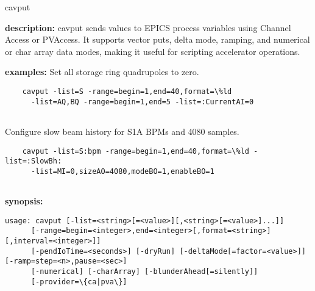 \begin{sddsprog}{cavput}
\item \textbf{description:}
    cavput sends values to EPICS process variables using Channel Access or PVAccess. It supports vector puts, delta mode, ramping, and numerical or char array data modes, making it useful for scripting accelerator operations.
\item \textbf{examples:}
    Set all storage ring quadrupoles to zero.
    \begin{verbatim}
    cavput -list=S -range=begin=1,end=40,format=\%ld
      -list=AQ,BQ -range=begin=1,end=5 -list=:CurrentAI=0
    
\end{verbatim}
    Configure slow beam history for S1A BPMs and 4080 samples.
    \begin{verbatim}
    cavput -list=S:bpm -range=begin=1,end=40,format=\%ld -list=:SlowBh:
      -list=MI=0,sizeAO=4080,modeBO=1,enableBO=1
    
\end{verbatim}
\item \textbf{synopsis:}
    \begin{verbatim}
usage: cavput [-list=<string>[=<value>][,<string>[=<value>]...]]
      [-range=begin=<integer>,end=<integer>[,format=<string>][,interval=<integer>]]
      [-pendIoTime=<seconds>] [-dryRun] [-deltaMode[=factor=<value>]] [-ramp=step=<n>,pause=<sec>]
      [-numerical] [-charArray] [-blunderAhead[=silently]]
      [-provider=\{ca|pva\}]
    

\end{verbatim}
\end{sddsprog}
